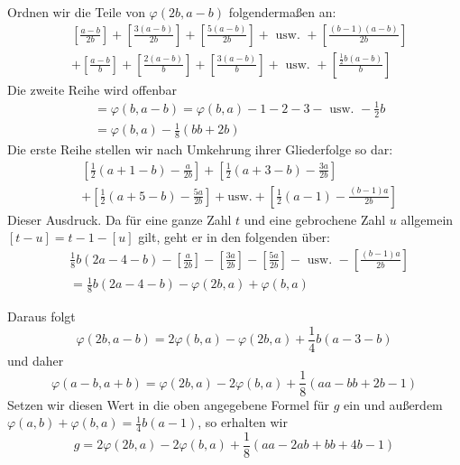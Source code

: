 Ordnen wir die Teile von $\varphi(2b,a-b)$ folgendermaßen an:
\[
\begin{aligned}
&\left[\frac{a-b}{2b}\right]+\left[\frac{3(a-b)}{2b}\right]+\left[\frac{5(a-b)}{2b}\right]+\text{ usw. }+\left[\frac{(b-1)(a-b)}{2b}\right]\\
&+\left[\frac{a-b}{b}\right]+\left[\frac{2(a-b)}{b}\right]+\left[\frac{3(a-b)}{b}\right]+\text{ usw. }+\left[\frac{\frac12b(a-b)}{b}\right]
\end{aligned}
\]
Die zweite Reihe wird offenbar
\[
\begin{aligned}
&=\varphi(b,a-b)=\varphi(b,a)-1-2-3-\text{ usw. }-\frac12b\\
&=\varphi(b,a)-\frac18(bb+2b)
\end{aligned}
\]
Die erste Reihe stellen wir nach Umkehrung ihrer Gliederfolge so dar:
\[
\begin{aligned}
&\left[\frac12(a+1-b)-\frac{a}{2b}\right]+\left[\frac12(a+3-b)-\frac{3a}{2b}\right]\\
&+\left[\frac12(a+5-b)-\frac{5a}{2b}\right]+\text{usw.}+\left[\frac12(a-1)-\frac{(b-1)a}{2b}\right]
\end{aligned}
\]
Dieser Ausdruck. Da für eine ganze Zahl $t$ und eine gebrochene Zahl $u$ allgemein $[t-u]=t-1-[u]$ gilt, geht er in den folgenden über:
\[
\begin{aligned}
&\frac18b(2a-4-b)-\left[\frac{a}{2b}\right]-\left[\frac{3a}{2b}\right]-\left[\frac{5a}{2b}\right]-\text{ usw. }-\left[\frac{(b-1)a}{2b}\right]\\
&=\frac18b(2a-4-b)-\varphi(2b,a)+\varphi(b,a)
\end{aligned}
\]

%
Daraus folgt
\[
\varphi(2b,a-b)=2\varphi(b,a)-\varphi(2b,a)+\frac14b(a-3-b)
\]
und daher
\[
\varphi(a-b,a+b)=\varphi(2b,a)-2\varphi(b,a)+\frac18(aa-bb+2b-1)
\]
Setzen wir diesen Wert in die oben angegebene Formel für $g$ ein und außerdem $\varphi(a,b)+\varphi(b,a)=\frac14b(a-1)$, so erhalten wir
\[
g=2\varphi(2b,a)-2\varphi(b,a)+\frac18(aa-2ab+bb+4b-1)
\]

